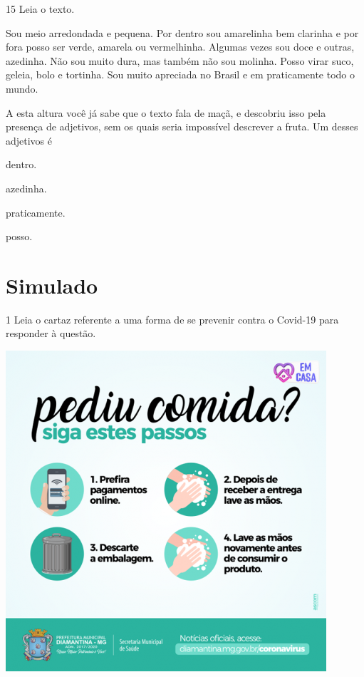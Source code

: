 \num{15} Leia o texto.

\begin{myquote}
Sou meio arredondada e pequena. Por dentro sou amarelinha bem clarinha e
por fora posso ser verde, amarela ou vermelhinha. Algumas vezes sou doce
e outras, azedinha. Não sou muito dura, mas também não sou molinha.
Posso virar suco, geleia, bolo e tortinha. Sou muito apreciada no Brasil
e em praticamente todo o mundo.

\end{myquote}

A esta altura você já sabe que o texto fala de maçã, e descobriu isso
pela presença de adjetivos, sem os quais seria impossível descrever a
fruta. Um desses adjetivos é

\begin{escolha}
\item dentro.

\item azedinha.

\item praticamente.

\item posso.
\end{escolha}

\chapter[Simulado 4]{Simulado}


\num{1} Leia o cartaz referente a uma forma de se prevenir contra o Covid-19
para responder à questão.
\vspace{2ex}

\begin{center}
\includegraphics[width=.9\textwidth]{./media/image36.png}
\end{center}

